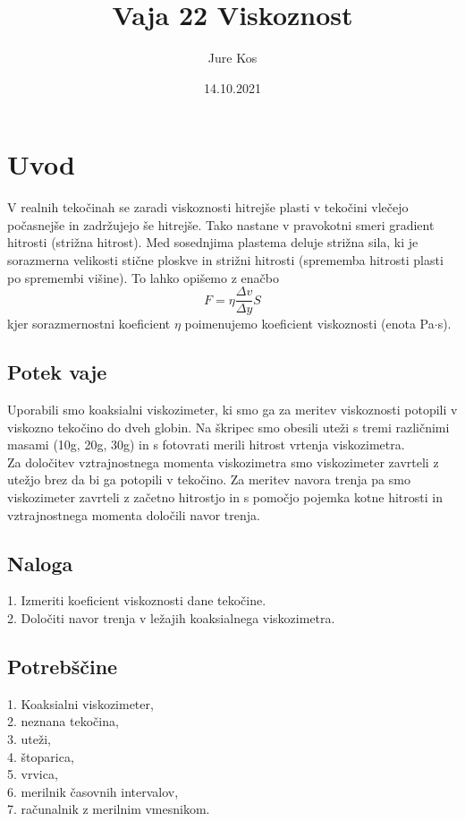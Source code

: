 \documentclass[a4paper]{report}
\title{Vaja 22 Viskoznost}
\author{Jure Kos}
\date{14.10.2021}
\begin{document}
\maketitle
\chapter*{Uvod}
V realnih tekočinah se zaradi viskoznosti hitrejše plasti v tekočini vlečejo počasnejše in zadržujejo še hitrejše. Tako nastane v pravokotni smeri gradient hitrosti (strižna hitrost). Med sosednjima plastema deluje strižna sila, ki je sorazmerna velikosti stične ploskve in strižni hitrosti (sprememba hitrosti plasti po spremembi višine). To lahko opišemo z enačbo
\[F = \eta \frac{\Delta v}{\Delta y} S \]
kjer sorazmernostni koeficient \(\eta\) poimenujemo koeficient viskoznosti (enota Pa$\cdot$s).

\section*{Potek vaje}
Uporabili smo koaksialni viskozimeter, ki smo ga za meritev viskoznosti potopili v viskozno tekočino do dveh globin. Na škripec smo obesili uteži s tremi različnimi masami (10g, 20g, 30g) in s fotovrati merili hitrost vrtenja viskozimetra. \\

\noindent Za določitev vztrajnostnega momenta viskozimetra smo viskozimeter zavrteli z utežjo brez da bi ga potopili v tekočino. Za meritev navora trenja pa smo viskozimeter zavrteli z začetno hitrostjo in s pomočjo pojemka kotne hitrosti in vztrajnostnega momenta določili navor trenja. 


\section*{Naloga}
1. Izmeriti koeficient viskoznosti dane tekočine.\\
2. Določiti navor trenja v ležajih koaksialnega viskozimetra.


\section*{Potrebščine}
1. Koaksialni viskozimeter,\\
2. neznana tekočina,\\
3. uteži,\\
4. štoparica,\\
5. vrvica,\\
6. merilnik časovnih intervalov,\\
7. računalnik z merilnim vmesnikom.\\
\end{document}
